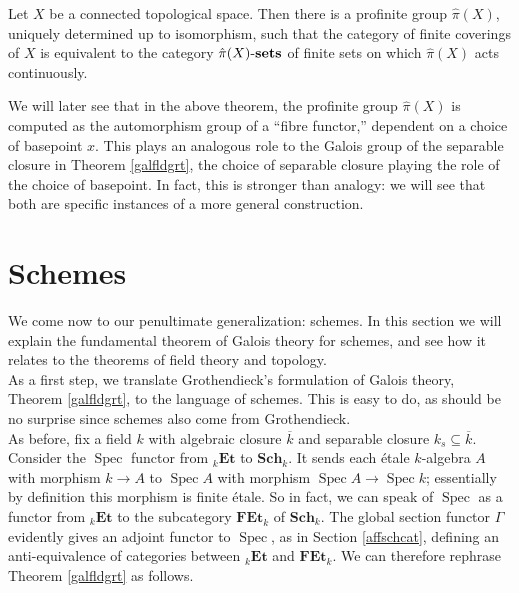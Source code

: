 \documentclass[11pt,openany]{book} %
\newcommand{\spc}{\operatorname{Spec}}
\newcommand{\xsets}[1]{#1\textnormal{-}\mathbf{sets}}
\begin{document}
\begin{theorem} \label{galtop2}
Let $X$ be a connected topological space. Then there is a profinite group $\hat{\pi}(X)$, uniquely determined up to isomorphism, such that the category of finite coverings of $X$ is equivalent to the category $\xsets{\hat{\pi}(X)}$ of finite sets on which $\hat{\pi}(X)$ acts continuously.
\end{theorem}

We will later see that in the above theorem, the profinite group $\hat{\pi}(X)$ is computed as the automorphism group of a ``fibre functor,'' dependent on a choice of basepoint $x$. This plays an analogous role to the Galois group of the separable closure in Theorem \ref{galfldgrt}, the choice of separable closure playing the role of the choice of basepoint. In fact, this is stronger than analogy: we will see that both are specific instances of a more general construction.


\section{Schemes} \label{secgalsch}
We come now to our penultimate generalization: schemes. In this section we will explain the fundamental theorem of Galois theory for schemes, and see how it relates to the theorems of field theory and topology.\\

As a first step, we translate Grothendieck's formulation of Galois theory, Theorem \ref{galfldgrt}, to the language of schemes. This is easy to do, as should be no surprise since schemes also come from Grothendieck.\\

As before, fix a field $k$ with algebraic closure $\overline{k}$ and separable closure $k_s \subseteq \overline{k}$. Consider the $\spc$ functor from $_k\mathbf{Et}$ to $\mathbf{Sch}_k$. It sends each \'etale $k$-algebra $A$ with morphism $k \to A$ to $\spc A$ with morphism $\spc A \to \spc k$; essentially by definition this morphism is finite \'etale. So in fact, we can speak of $\spc$ as a functor from $_k\mathbf{Et}$ to the subcategory $\mathbf{FEt}_k$ of $\mathbf{Sch}_k$. The global section functor $\Gamma$ evidently gives an adjoint functor to $\spc$, as in Section \ref{affschcat}, defining an anti-equivalence of categories between $_k\mathbf{Et}$ and $\mathbf{FEt}_k$. We can therefore rephrase Theorem \ref{galfldgrt} as follows.\\
\end{document}
